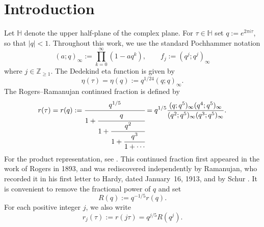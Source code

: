 \documentclass{amsart}
\theoremstyle{definition}
\begin{document}
\section{Introduction}
Let $\mathbb{H}$ denote the upper half-plane of the complex plane. For $\tau\in\mathbb{H}$ set
$q:=e^{2\pi i\tau}$, so that $|q|<1$. {Throughout this work, we} use the {standard Pochhammer} notation
\begin{equation*}
(a;q)_\infty:=\prod_{k=0}^{\infty}(1-aq^k),
\qquad
f_j:=(q^j;q^j)_\infty
\end{equation*}
{where $j\in\mathbb{Z}_{\ge 1}$.}
The Dedekind eta function is {given by}
\begin{equation*}
\eta(\tau)=\eta(q):=q^{1/24}(q;q)_\infty.
\end{equation*}
The Rogers--Ramanujan continued fraction is defined by
\begin{equation*}
r(\tau)=r(q):=
\cfrac{q^{1/5}}
{1+\cfrac{q}
{1+\cfrac{q^2}
{1+\cfrac{q^3}
{1+\cdots}}}}
=
q^{1/5}
\frac{(q;q^5)_\infty(q^4;q^5)_\infty}
{(q^2;q^5)_\infty(q^3;q^5)_\infty}.
\end{equation*}
For the product representation, see \cite[Theorem 7.3.3]{Berndt06}. This
continued fraction first appeared in the work of Rogers \cite{Rogers} in 1893, and
was rediscovered independently by Ramanujan, who recorded it in his first
letter to Hardy, dated January~16, 1913, and by Schur \cite{Schur}.
It is convenient to remove the
fractional power of $q$ and set
\begin{equation*}
R(q):=q^{-1/5}r(q).
\end{equation*}
For each positive integer $j$, we also write
\begin{equation*}
r_j(\tau):=r(j\tau)=q^{j/5}R(q^j).
\end{equation*}
\end{document}
